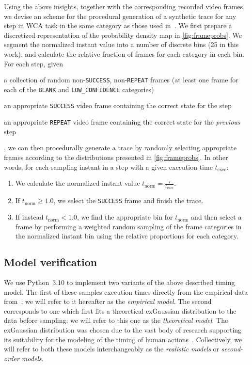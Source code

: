 Using the above insights, together with the corresponding recorded video frames, we devise an scheme for the procedural generation of a synthetic trace for any step in \ac{WCA} task in the same category as those used in~\cite{olguinmunoz:impact2021}.
We first prepare a discretized representation of the probability density map in \cref{fig:frameprobs}.
We segment the normalized instant value into a number of discrete bins (\num{25} in this work), and calculate the relative fraction of frames for each category in each bin.
For each step, given
\begin{enumerate*}[itemjoin={{; }}, itemjoin*={{; and }}]
    \item a collection of random non-\texttt{SUCCESS}, non-\texttt{REPEAT} frames (at least one frame for each of the \texttt{BLANK} and \texttt{LOW\_CONFIDENCE} categories)
    \item an appropriate \texttt{SUCCESS} video frame containing the correct state for the step
    \item an appropriate \texttt{REPEAT} video frame containing the correct state for the \emph{previous} step
\end{enumerate*},
we can then procedurally generate a trace by randomly selecting appropriate frames according to the distributions presented in \cref{fig:frameprobs}.
In other words, for each sampling instant in a step with a given execution time \( t_\text{exec} \):
\begin{enumerate}
    \item We calculate the normalized instant value \( t_\text{norm} = \frac{\tau}{t_\text{exec}} \).
    \item If \( t_\text{norm} \ge 1.0 \), we select the \texttt{SUCCESS} frame and finish the trace.
    \item If instead \( t_\text{norm} < 1.0 \), we find the appropriate bin for \( t_\text{norm} \) and then select a frame by performing a weighted random sampling of the frame categories in the normalized instant bin using the relative proportions for each category.
\end{enumerate}

\subsection{Model verification}\label{ssec:model:verification}

We use Python~\num{3.10} to implement two variants of the above described timing model.
The first of these samples execution times directly from the empirical data from~\cite{olguinmunoz:impact2021}; we will refer to it hereafter as the \emph{empirical model}.
The second corresponds to one which first fits a theoretical \ac{exGaussian} distribution to the data before sampling; we will refer to this one as the \emph{theoretical model}.
The \ac{exGaussian} distribution was chosen due to the vast body of research supporting its suitability for the modeling of the timing of human actions~\cite{Rohrer1994analysis,Palmer2011shapes,Marmolejo2022generalised}.
Collectively, we will refer to both these models interchangeably as the \emph{realistic models} or \emph{second-order models}.

